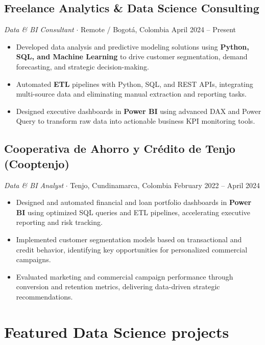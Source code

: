\documentclass[letterpaper,10pt]{article}
\begin{document}
\subsection*{Freelance Analytics \& Data Science Consulting}
\textit{Data \& BI Consultant} \hspace{4pt}$\cdot$\hspace{4pt} Remote / Bogotá, Colombia \hfill \small{April 2024 -- Present}
\begin{itemize}
    \item Developed data analysis and predictive modeling solutions using \textbf{Python, SQL, and Machine Learning} to drive customer segmentation, demand forecasting, and strategic decision-making.
    \item Automated \textbf{ETL} pipelines with Python, SQL, and REST APIs, integrating multi-source data and eliminating manual extraction and reporting tasks.
    \item Designed executive dashboards in \textbf{Power BI} using advanced DAX and Power Query to transform raw data into actionable business KPI monitoring tools.
\end{itemize}

\vspace{0.08cm}
\subsection*{Cooperativa de Ahorro y Crédito de Tenjo (Cooptenjo)}
\textit{Data \& BI Analyst} \hspace{4pt}$\cdot$\hspace{4pt} Tenjo, Cundinamarca, Colombia \hfill \small{February 2022 -- April 2024}
\begin{itemize}
    \item Designed and automated financial and loan portfolio dashboards in \textbf{Power BI} using optimized SQL queries and ETL pipelines, accelerating executive reporting and risk tracking.
    \item Implemented customer segmentation models based on transactional and credit behavior, identifying key opportunities for personalized commercial campaigns.
    \item Evaluated marketing and commercial campaign performance through conversion and retention metrics, delivering data-driven strategic recommendations.
\end{itemize}

\section*{Featured Data Science projects}
\end{document}
